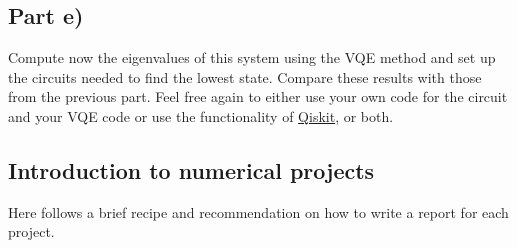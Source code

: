 \documentclass[%
oneside,                 %
final,                   %
10pt]{article}
\begin{document}
\subsection*{Part e)}

Compute now the eigenvalues of this system using the VQE method and
set up the circuits needed to find the lowest state. Compare these
results with those from the previous part. Feel free again to either
use your own code for the circuit and your VQE code or use the
functionality of \href{{https://qiskit.org/}}{Qiskit}, or both.

\subsection*{Introduction to numerical projects}

Here follows a brief recipe and recommendation on how to write a report for each
project.
\end{document}
